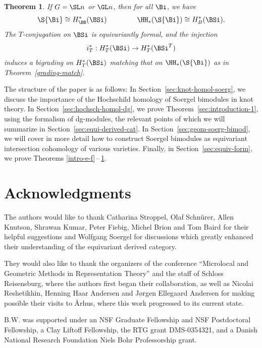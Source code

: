 \documentclass[12pt]{wart}
\newtheorem{thm}{Theorem}[section]
\theoremstyle{remark}
\begin{document}
\begin{thm}\label{BS-match} If $G=\SL n$ or $\GL n$, then 
  for all $\Bi$, we have
  \begin{equation*}
    \S{\Bi}\cong H^*_{\BB}(\BSi)\hspace{15mm}\HH_*(\S{\Bi})\cong H^*_{B}(\BSi).
  \end{equation*}
  The $T$-conjugation on $\BSi$ is equivariantly formal, and the injection
  \begin{equation*}
    i^*_T:H^*_T(\BSi)\to H_T^*(\BSi^T)
  \end{equation*}
  induces a bigrading on $H^*_T(\BSi)$ matching that on
  $\HH_*(\S{\Bi})$ as in Theorem~\ref{grading-match}.
\end{thm}

The structure of the paper is as follows: In
Section~\ref{sec:knot-homol-soerg}, we discuss the importance of the
Hochschild homology of Soergel bimodules in knot theory.  In
Section~\ref{sec:hochsch-homol-dg}, we prove
Theorem~\ref{sec:introduction-1}, using the formalism of dg-modules,
the relevant points of which we will summarize in
Section~\ref{sec:equi-derived-cat}.  In
Section~\ref{sec:geom-soerg-bimod}, we will cover in more detail how
to construct Soergel bimodules as equivariant intersection cohomology
of various varieties.  Finally, in Section~\ref{sec:equiv-form}, we
prove Theorems \ref{intro-e-f}\,--\,\ref{BS-match}.

\section*{Acknowledgments}
\label{sec:acknowledgments}

The authors would like to thank Catharina Stroppel, Olaf Schn\"urer,  Allen Knutson, Shrawan Kumar, Peter Fiebig,  Michel Brion and Tom Baird
for their helpful suggestions and Wolfgang Soergel for discussions
which greatly enhanced their understanding of the equivariant derived
category.

They would also like to thank the organizers of
the conference ``Microlocal and Geometric Methods in Representation
Theory'' and the staff of Schloss Reisensburg, where the authors first
began their collaboration, as well as Nicolai Reshetikhin, Henning
Haar Andersen and J{\o}rgen Ellegaard Andersen for making possible
their visits to {\AA}rhus, where this work progressed to its current
state.

B.W. was supported under an NSF Graduate Fellowship and NSF Postdoctoral
Fellowship, a Clay Liftoff Fellowship, the RTG grant DMS-0354321,
and a Danish National Research Foundation Niels Bohr Professorship
grant.
\end{document}
